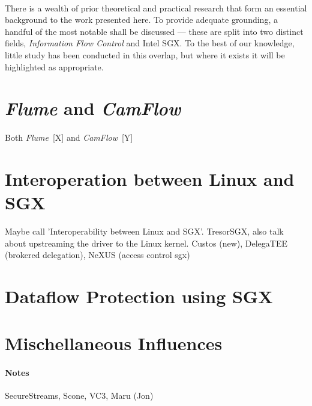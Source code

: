 \paragraph{} There is a wealth of prior theoretical and practical research that form an essential background to the work presented here. To provide adequate grounding, a handful of the most notable shall be discussed --- these are split into two distinct fields, \textit{Information Flow Control} and Intel SGX. To the best of our knowledge, little study has been conducted in this overlap, but where it exists it will be highlighted as appropriate.


\section{\textit{Flume} and \textit{CamFlow}}
\paragraph{} Both \textit{Flume}~[X] and \textit{CamFlow}~[Y]

\section{Interoperation between Linux and SGX} Maybe call 'Interoperability between Linux and SGX'. TresorSGX, also talk about upstreaming the driver to the Linux kernel. Custos (new), DelegaTEE (brokered delegation), NeXUS (access control sgx)


\section{Dataflow Protection using SGX}

\section{Mischellaneous Influences}


\paragraph{Notes} SecureStreams, Scone, VC3, Maru (Jon)

